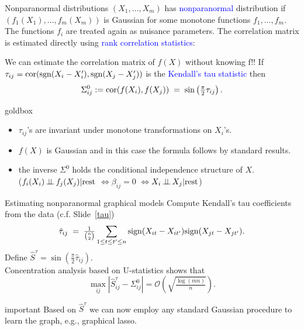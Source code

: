\documentclass[dvipsnames,aspectratio=169]{beamer} %
\DeclareMathOperator{\sgn}{sgn}
\newcommand{\indep}{\mbox{\,$\perp\!\!\!\perp$\,}}
\begin{document}
\begin{frame}[label=npn]{Nonparanormal distributions}
	$(X_1,\ldots,X_m)$ has \textcolor{blue}{nonparanormal} distribution if $(f_1(X_1),\ldots,f_m(X_m))$ is Gaussian for some monotone functions $f_1,\ldots,f_m$.\\[.3cm]
	The functions $f_i$ are treated again as nuisance parameters. The correlation matrix is estimated directly using \textcolor{blue}{rank correlation statistics}:\\[.2cm]
	\begin{alertblock}{We can estimate the correlation matrix of $f(X)$ without knowing f!!}
		If $\tau_{ij}={\rm cor}(\sgn(X_i-X_i'),\sgn(X_j-X_j'))$ is the \textcolor{blue}{Kendall's tau statistic} then
	$$
	\Sigma^0_{ij}:={\rm cor}(f(X_i),f(X_j))\;=\;\sin\left(\tfrac{\pi}{2}\tau_{ij}\right).
	$$
	\begin{beamercolorbox}[wd=\paperwidth,sep=5pt]{goldbox}
	\begin{itemize}
		\item $\tau_{ij}$'s are invariant under monotone transformations on $X_i$'s.
		\item $f(X)$ is Gaussian and in this case the formula follows by standard results.
		\item the inverse $\Sigma^0$ holds the conditional independence structure of $X$.\\{\footnotesize ($f_i(X_i)\indep f_j(X_j)|{\rm rest}$ \qquad$\Leftrightarrow$\qquad $\beta_{ij}=0$ \qquad$\Leftrightarrow$\qquad $X_i \indep X_j|{\rm rest}$)}
	\end{itemize}
	\end{beamercolorbox}
	\end{alertblock}
\end{frame}


\begin{frame}[label=npn2]{Estimating nonparanormal graphical models}
		Compute \alert{Kendall's tau} coefficients from the data (c.f. Slide~\ref{tau}) 	$$
	\hat \tau_{ij}\;=\;\tfrac{1}{{n\choose 2}}\sum_{1\leq t\leq t'\leq n}{\rm sign}(X_{it}-X_{it'}){\rm sign}(X_{jt}-X_{jt'}).
	$$
	Define $\hat S^\tau=\sin(\tfrac{\pi}{2}\hat\tau_{ij})$.\\[.3cm]
	Concentration analysis based on U-statistics shows that
	$$
	\max_{ij}|\hat S^\tau_{ij}-\Sigma^0_{ij}|=\mathcal O\left(\sqrt{\tfrac{\log(mn)}{n}}\right).
	$$
	\begin{beamercolorbox}[wd=\paperwidth,sep=5pt]{important}
		Based on $\hat S^\tau$ we can now employ any standard Gaussian procedure to learn the graph, e.g., graphical lasso.
	\end{beamercolorbox}

\end{frame}
\end{document}
